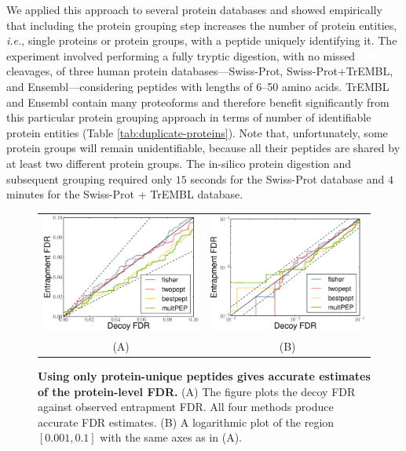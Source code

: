 \documentclass{article}
\begin{document}
We applied this approach to several protein databases and showed 
empirically that including the protein grouping step increases the 
number of protein entities, {\em i.e.}, single proteins or protein 
groups, with a peptide uniquely identifying it. The experiment 
involved performing a fully tryptic digestion, with no missed 
cleavages, of three human protein databases---Swiss-Prot, 
Swiss-Prot+TrEMBL, and Ensembl---considering peptides with lengths of 
6--50 amino acids. TrEMBL and Ensembl contain many proteoforms and 
therefore benefit significantly from this particular protein grouping 
approach in terms of number of identifiable protein entities (Table 
\ref{tab:duplicate-proteins}). Note that, unfortunately, some protein 
groups will remain unidentifiable, because all their peptides are 
shared by at least two different protein groups. The in-silico protein 
digestion and subsequent grouping required only $15$ seconds for the 
Swiss-Prot database and $4$ minutes for the Swiss-Prot + TrEMBL 
database.

\begin{figure}
\begin{center}
\begin{tabular}{cc} 
\includegraphics[width=0.45\linewidth]{./img/unique-pept-accuracy} &
\includegraphics[width=0.45\linewidth]{./img/unique-pept-accuracy-log}
\\
(A) & (B)
\end{tabular}
\caption{\label{fig:unique-accuracy}\textbf{Using only protein-unique
    peptides gives accurate estimates of the protein-level FDR.}  (A)
  The figure plots the decoy FDR against observed entrapment FDR.  All
  four methods produce accurate FDR estimates. (B) A logarithmic plot
  of the region $[0.001, 0.1]$ with the same axes as in (A).}
\end{center}
\end{figure}
\end{document}
